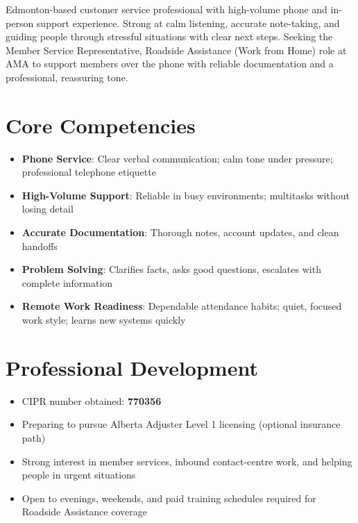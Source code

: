 \documentclass[11pt,a4paper,sans]{moderncv}
\begin{document}
\makecvtitle

\vspace{6pt}
\small{Edmonton-based customer service professional with high-volume phone and in-person support experience. Strong at calm listening, accurate note-taking, and guiding people through stressful situations with clear next steps. Seeking the Member Service Representative, Roadside Assistance (Work from Home) role at AMA to support members over the phone with reliable documentation and a professional, reassuring tone.}

\section{Core Competencies}
\vspace{1pt}
\begin{itemize}
\item \textbf{Phone Service}: Clear verbal communication; calm tone under pressure; professional telephone etiquette
\item \textbf{High-Volume Support}: Reliable in busy environments; multitasks without losing detail
\item \textbf{Accurate Documentation}: Thorough notes, account updates, and clean handoffs
\item \textbf{Problem Solving}: Clarifies facts, asks good questions, escalates with complete information
\item \textbf{Remote Work Readiness}: Dependable attendance habits; quiet, focused work style; learns new systems quickly
\end{itemize}

\section{Professional Development}
\vspace{1pt}
\begin{itemize}
\item CIPR number obtained: \textbf{770356}
\item Preparing to pursue Alberta Adjuster Level 1 licensing (optional insurance path)
\item Strong interest in member services, inbound contact-centre work, and helping people in urgent situations
\item Open to evenings, weekends, and paid training schedules required for Roadside Assistance coverage
\end{itemize}
\end{document}
